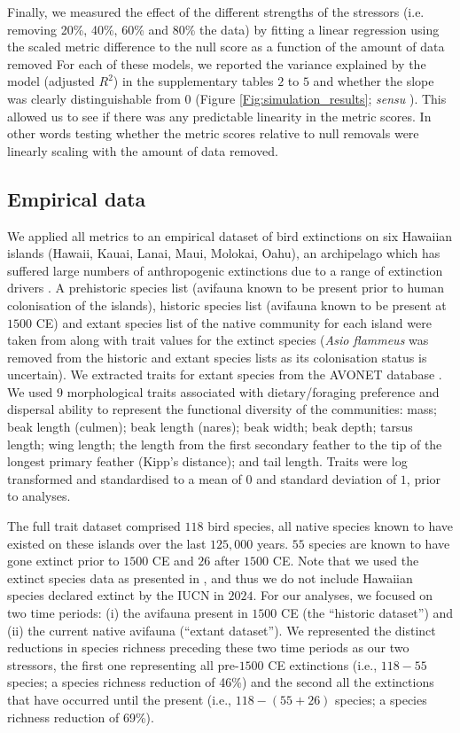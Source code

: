 \documentclass[12pt,letterpaper]{article}
\begin{document}
Finally, we measured the effect of the different strengths of the stressors (i.e. removing 20\%, 40\%, 60\% and 80\% the data) by fitting a linear regression using the scaled metric difference to the null score as a function of the amount of data removed
For each of these models, we reported the variance explained by the model (adjusted $R^2$) in the supplementary tables $2$ to $5$ and whether the slope was clearly distinguishable from $0$ (Figure \ref{Fig:simulation_results}; \textit{sensu} \citealt{dushoff2019can}).
This allowed us to see if there was any predictable linearity in the metric scores.
In other words testing whether the metric scores relative to null removals were linearly scaling with the amount of data removed.


\subsection{Empirical data}


We applied all metrics to an empirical dataset of bird extinctions on six Hawaiian islands (Hawaii, Kauai, Lanai, Maui, Molokai, Oahu), an archipelago which has suffered large numbers of anthropogenic extinctions due to a range of extinction drivers \citep{Walther2022}.
A prehistoric species list (avifauna known to be present prior to human colonisation of the islands), historic species list (avifauna known to be present at $1500$ CE) and extant species list of the native community for each island were taken from \cite{matthews2023global} along with trait values for the extinct species (\textit{Asio flammeus} was removed from the historic and extant species lists as its colonisation status is uncertain).
We extracted traits for extant species from the AVONET database \citep{tobias2022avonet}.
We used $9$ morphological traits associated with dietary/foraging preference and dispersal ability \citep{pigot2020macroevolutionary,sheard2020ecological} to represent the functional diversity of the communities: mass; beak length (culmen); beak length (nares); beak width; beak depth; tarsus length; wing length; the length from the first secondary feather to the tip of the longest primary feather (Kipp's distance); and tail length.
Traits were log transformed and standardised to a mean of $0$ and standard deviation of $1$, prior to analyses.

The full trait dataset comprised $118$ bird species, all native species known to have existed on these islands over the last $125,000$ years.
$55$ species are known to have gone extinct prior to $1500$ CE and $26$ after $1500$ CE.
Note that we used the extinct species data as presented in \cite{matthews2023global}, and thus we do not include Hawaiian species declared extinct by the IUCN in $2024$.
For our analyses, we focused on two time periods: (i) the avifauna present in $1500$ CE (the ``historic dataset'') and (ii) the current native avifauna (``extant dataset'').
We represented the distinct reductions in species richness preceding these two time periods as our two stressors, the first one representing all pre-$1500$ CE extinctions (i.e., $118-55$ species; a species richness reduction of 46\%) and the second all the extinctions that have occurred until the present (i.e., $118-(55+26)$ species; a species richness reduction of 69\%).
\end{document}
